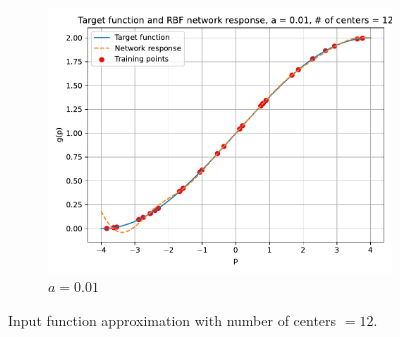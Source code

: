 \begin{figure}[htbp]
\begin{subfigure}{0.33\linewidth}
		\includegraphics[width=\linewidth]{../Problem 2/prob2_response_a_0.01_Cnum_12.pdf}
		\caption{$a=0.01$}
	\end{subfigure}\hfill
	\caption{Input function approximation with number of centers $=12$.}
	\label{fig:prob2_response_12}
\end{figure}

